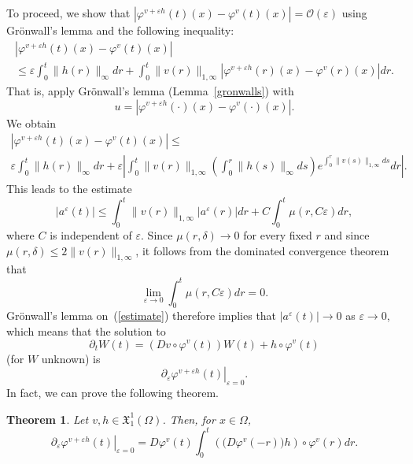 \documentclass[a5paper,10pt,twoside]{article}
\newcommand{\X}{\ensuremath{\mathfrak{X}}}
\theoremstyle{plain}
\newtheorem{teo}{Theorem}[section]
\theoremstyle{definition}
\theoremstyle{remark}
\begin{document}
To proceed, we show that $|\varphi^{v+\varepsilon h}(t)(x)-\varphi^v(t)(x)|=\mathcal{O}(\varepsilon)$ using Grön\-wall's lemma and the following inequality:
%
\begin{multline*}
|\varphi^{v+\varepsilon h}(t)(x)-\varphi^v(t)(x)|\\ \leq  \varepsilon\int_0^t\|h(r)\|_\infty dr+ \int_0^t\|v(r)\|_{1,\infty}\left|\varphi^{v+\varepsilon h}(r)(x)-\varphi^v(r)(x)\right|dr .
\end{multline*}
%
That is, apply Grönwall's lemma (Lemma~\ref{gronwalls}) with $$u=|\varphi^{v+\varepsilon h}(\cdot)(x)-\varphi^v(\cdot)(x)|.$$
We obtain
%
\begin{multline*}
|\varphi^{v+\varepsilon h}(t)(x)-\varphi^v(t)(x)|\leq \\  \varepsilon\int_0^t\|h(r)\|_\infty dr 
+ \varepsilon\left|\int_0^t\|v(r)\|_{1,\infty}\left(\int_0^r\|h(s)\|_\infty ds\right)e^{\int_0^r \|v(s)\|_{1,\infty}ds} dr\right|.
\end{multline*}
%
This leads to the estimate
%
\begin{equation}
\label{estimate}
|a^\varepsilon(t)|\leq \int_0^t\|v(r)\|_{1,\infty}|a^\varepsilon(r)|dr + C\int_0^t\mu(r,C\varepsilon)dr,
\end{equation}
%
where $C$ is independent of $\varepsilon$. Since $\mu(r,\delta)\to 0$ for every fixed $r$ and since $\mu(r,\delta)\leq 2\|v(r)\|_{1,\infty}$, it follows from the dominated convergence theorem that
\[
\lim_{\varepsilon\to 0}\int_0^t \mu(r,C\varepsilon)dr=0.
\]
Grönwall's lemma on~(\ref{estimate}) therefore implies that $|a^\varepsilon(t)|\to 0$ as $\varepsilon\to 0$, which means that the solution to
\[
\partial_t W(t)=\left(Dv\circ \varphi^v(t)\right)W(t)+h\circ \varphi^v(t)
\]
(for $W$ unknown) is
\[
\left.\partial_\varepsilon\varphi^{v+\varepsilon h}(t)\right|_{\varepsilon=0}.
\]
In fact, we can prove the following theorem.

\begin{teo}
	Let $v,h\in \X_1^1(\Omega)$. Then, for $x\in\Omega$,
	\[
	\left.\partial_\varepsilon\varphi^{v+\varepsilon h}(t)\right|_{\varepsilon=0}=D\varphi^v(t)\int_0^t\left(\big(D\varphi^v(-r)\big)h\right)\circ \varphi^v(r) dr.
	\]
\end{teo}
\end{document}
